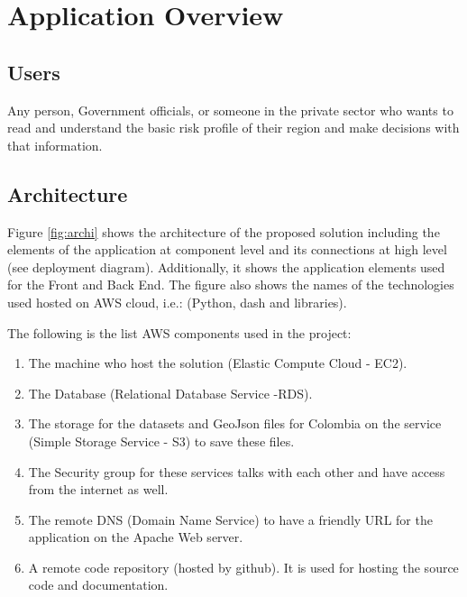 \section{Application Overview}
\label{sec:appOver}


\subsection{Users}
Any person, Government officials, or someone in the private sector who wants to read and understand the basic risk profile of their region and make decisions with that information.

\subsection{Architecture}

Figure \ref{fig:archi} shows the architecture of the proposed solution including the elements of the application at component level and its connections at high level (see deployment diagram). Additionally, it shows the application elements used for the Front and Back End. The figure also shows the names of the technologies used hosted on AWS cloud, i.e.: (Python, dash and libraries).   

The following is the list AWS components used in the project: 
\begin{enumerate}
\item The machine who host the solution (Elastic Compute Cloud - EC2). 
\item The Database  (Relational Database Service -RDS).
\item The storage for the datasets and GeoJson files for Colombia on the service  (Simple Storage Service - S3) to save these files.
\item The Security group for these services talks with each other and have access from the internet as well.
\item The remote DNS (Domain Name Service) to have a friendly URL for the application on the Apache Web server.
\item A remote code repository (hosted by github). It is used for hosting the source code and documentation. 

\end{enumerate}


